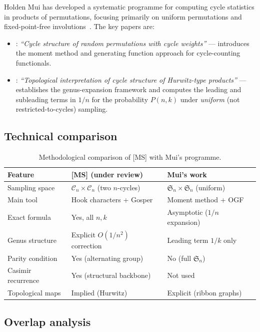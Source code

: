 \documentclass[12pt, a4paper]{amsart}
\theoremstyle{plain}
\theoremstyle{definition}
\theoremstyle{remark}
\newcommand{\C}{\mathcal{C}}
\newcommand{\Sn}{\mathfrak{S}_n}
\begin{document}
Holden Mui has developed a systematic programme for computing cycle statistics
in products of permutations, focusing primarily on uniform permutations
and fixed-point-free involutions~\cite{mui1,mui2}.  The key papers are:
\begin{itemize}
  \item \cite{mui1}: \emph{``Cycle structure of random permutations with cycle
        weights''} — introduces the moment method and generating function approach
        for cycle-counting functionals.
  \item \cite{mui2}: \emph{``Topological interpretation of cycle structure of
        Hurwitz-type products''} — establishes the genus-expansion framework and
        computes the leading and subleading terms in $1/n$ for the probability
        $P(n,k)$ under \emph{uniform} (not restricted-to-cycles) sampling.
\end{itemize}

\subsection{Technical comparison}

\begin{table}[h]
\centering
\begin{tabular}{lll}
\toprule
\textbf{Feature} & \textbf{[MS] (under review)} & \textbf{Mui's work} \\
\midrule
Sampling space & $\C_n\times\C_n$ (two $n$-cycles) & $\Sn\times\Sn$ (uniform) \\
Main tool & Hook characters + Gosper & Moment method + OGF \\
Exact formula & Yes, all $n,k$ & Asymptotic ($1/n$ expansion) \\
Genus structure & Explicit $O(1/n^2)$ correction & Leading term $1/k$ only \\
Parity condition & Yes (alternating group) & No (full $\Sn$) \\
Casimir recurrence & Yes (structural backbone) & Not used \\
Topological maps & Implied (Hurwitz) & Explicit (ribbon graphs) \\
\bottomrule
\end{tabular}
\caption{Methodological comparison of [MS] with Mui's programme.}
\label{tab:comparison}
\end{table}

\subsection{Overlap analysis}
\end{document}
